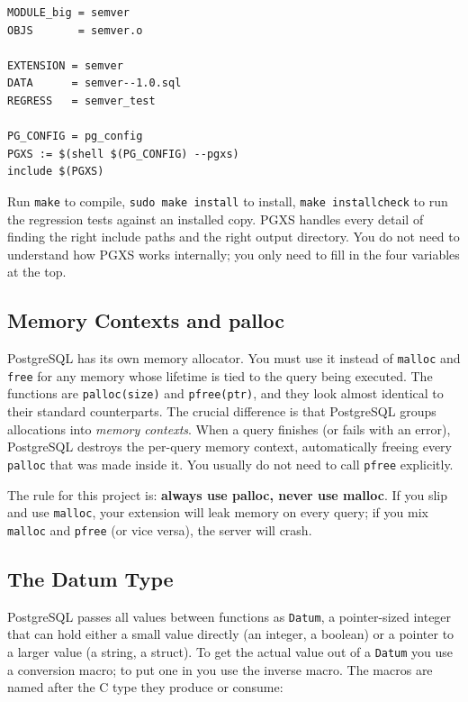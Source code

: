 \documentclass[11pt,a4paper]{article}
\begin{document}
\begin{codebox}
\begin{lstlisting}
MODULE_big = semver
OBJS       = semver.o

EXTENSION = semver
DATA      = semver--1.0.sql
REGRESS   = semver_test

PG_CONFIG = pg_config
PGXS := $(shell $(PG_CONFIG) --pgxs)
include $(PGXS)
\end{lstlisting}
\end{codebox}

Run \texttt{make} to compile, \texttt{sudo make install} to install, \texttt{make installcheck} to run the regression tests against an installed copy. PGXS handles every detail of finding the right include paths and the right output directory. You do not need to understand how PGXS works internally; you only need to fill in the four variables at the top.

\subsection{Memory Contexts and palloc}
PostgreSQL has its own memory allocator. You must use it instead of \texttt{malloc} and \texttt{free} for any memory whose lifetime is tied to the query being executed. The functions are \texttt{palloc(size)} and \texttt{pfree(ptr)}, and they look almost identical to their standard counterparts. The crucial difference is that PostgreSQL groups allocations into \textit{memory contexts}. When a query finishes (or fails with an error), PostgreSQL destroys the per-query memory context, automatically freeing every \texttt{palloc} that was made inside it. You usually do not need to call \texttt{pfree} explicitly.

The rule for this project is: \textbf{always use palloc, never use malloc}. If you slip and use \texttt{malloc}, your extension will leak memory on every query; if you mix \texttt{malloc} and \texttt{pfree} (or vice versa), the server will crash.

\subsection{The Datum Type}
PostgreSQL passes all values between functions as \texttt{Datum}, a pointer-sized integer that can hold either a small value directly (an integer, a boolean) or a pointer to a larger value (a string, a struct). To get the actual value out of a \texttt{Datum} you use a conversion macro; to put one in you use the inverse macro. The macros are named after the C type they produce or consume:
\end{document}
